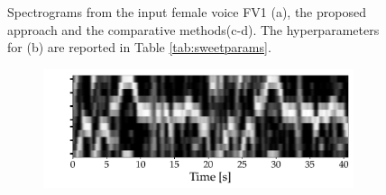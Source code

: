 \begin{figure}[t]
	\caption{Spectrograms from the input female voice FV1 (a), the proposed approach and the comparative methods(c-d). The hyperparameters for (b) are reported in Table \ref{tab:sweetparams}.}
	\label{fig:specgrams-1}
\end{figure}


\begin{figure}[t]
	\centering
	
	
	\begin{subfigure}[b]{0.46\textwidth}
		\includegraphics[width=\textwidth]{img/audioXsynth/plots/chromagram-specgram_Vox}
	\end{subfigure}
	\hfil
	

\end{figure}
